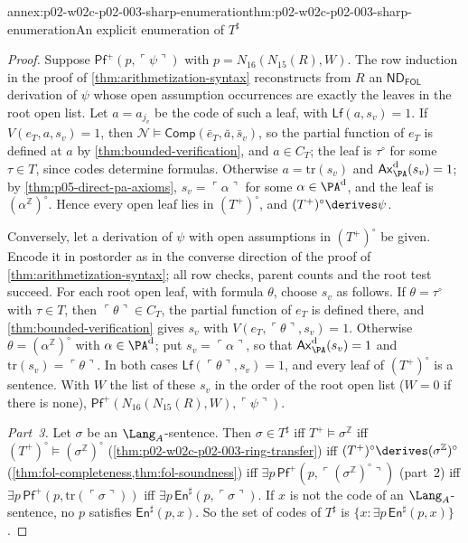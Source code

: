 \begin{annexitem}{annex:p02-w02c-p02-003-sharp-enumeration}{thm:p02-w02c-p02-003-sharp-enumeration}{An explicit enumeration of \(T^{\sharp}\)}
\begin{proof}
Suppose \(\mathsf{Pf}^{+}(p,\ulcorner\psi\urcorner)\) with
\(p=N_{16}(N_{15}(R),W)\).  The row induction in the proof of
\cref{thm:arithmetization-syntax} reconstructs from \(R\) an
\(\mathsf{ND}_{\mathsf{FOL}}\) derivation of \(\psi\) whose open assumption occurrences are
exactly the leaves in the root open list.  Let \(a=a_{j_v}\) be the code of
such a leaf, with \(\mathsf{Lf}(a,s_v)=1\).  If \(V(e_T,a,s_v)=1\), then
\(\mathcal N\models\mathsf{Comp}(\bar e_T,\bar a,\bar s_v)\), so the partial
function of \(e_T\) is defined at \(a\) by \cref{thm:bounded-verification},
and \(a\in C_T\); the leaf is \(\tau^{\circ}\) for some \(\tau\in T\), since
codes determine formulas.  Otherwise \(a=\mathrm{tr}(s_v)\) and
\(\mathsf{Ax}^{\rm d}_{\PA}(s_v)=1\); by \cref{thm:p05-direct-pa-axioms},
\(s_v=\ulcorner\alpha\urcorner\) for some \(\alpha\in\PA^{\rm d}\), and the
leaf is \((\alpha^{\mathbb Z})^{\circ}\).  Hence every open leaf lies in
\((T^{+})^{\circ}\), and \((T^{+})^{\circ}\derives\psi\).

Conversely, let a derivation of \(\psi\) with open assumptions in
\((T^{+})^{\circ}\) be given.  Encode it in postorder as in the converse
direction of the proof of \cref{thm:arithmetization-syntax}; all row
checks, parent counts and the root test succeed.  For each root open leaf,
with formula \(\theta\), choose \(s_v\) as follows.  If \(\theta=\tau^{\circ}\)
with \(\tau\in T\), then \(\ulcorner\theta\urcorner\in C_T\), the partial
function of \(e_T\) is defined there, and \cref{thm:bounded-verification}
gives \(s_v\) with \(V(e_T,\ulcorner\theta\urcorner,s_v)=1\).  Otherwise
\(\theta=(\alpha^{\mathbb Z})^{\circ}\) with \(\alpha\in\PA^{\rm d}\); put
\(s_v=\ulcorner\alpha\urcorner\), so that
\(\mathsf{Ax}^{\rm d}_{\PA}(s_v)=1\) and
\(\mathrm{tr}(s_v)=\ulcorner\theta\urcorner\).  In both cases
\(\mathsf{Lf}(\ulcorner\theta\urcorner,s_v)=1\), and every leaf of
\((T^{+})^{\circ}\) is a sentence.  With \(W\) the list of these \(s_v\) in
the order of the root open list (\(W=0\) if there is none),
\(\mathsf{Pf}^{+}(N_{16}(N_{15}(R),W),\ulcorner\psi\urcorner)\).

\emph{Part~3.}  Let \(\sigma\) be an \(\Lang_A\)-sentence.  Then
\(\sigma\in T^{\sharp}\) iff \(T^{+}\models\sigma^{\mathbb Z}\) iff
\((T^{+})^{\circ}\models(\sigma^{\mathbb Z})^{\circ}\)
(\cref{thm:p02-w02c-p02-003-ring-transfer}) iff
\((T^{+})^{\circ}\derives(\sigma^{\mathbb Z})^{\circ}\)
(\cref{thm:fol-completeness,thm:fol-soundness}) iff
\(\exists p\,\mathsf{Pf}^{+}(p,\ulcorner(\sigma^{\mathbb Z})^{\circ}\urcorner)\)
(part~2) iff \(\exists p\,\mathsf{Pf}^{+}(p,\mathrm{tr}(\ulcorner\sigma\urcorner))\)
iff \(\exists p\,\mathsf{En}^{\sharp}(p,\ulcorner\sigma\urcorner)\).  If
\(x\) is not the code of an \(\Lang_A\)-sentence, no \(p\) satisfies
\(\mathsf{En}^{\sharp}(p,x)\).  So the set of codes of \(T^{\sharp}\) is
\(\{x:\exists p\,\mathsf{En}^{\sharp}(p,x)\}\).


\end{proof}
\end{annexitem}
